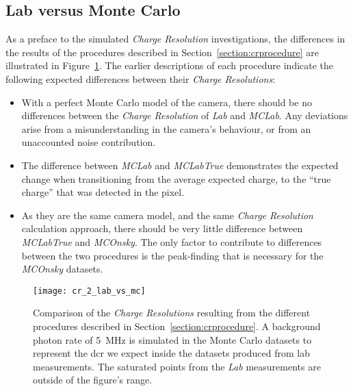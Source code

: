 \subsection{Lab versus Monte Carlo}

As a preface to the simulated \textit{Charge Resolution} investigations, the differences in the results of the procedures described in Section~\ref{section:crprocedure} are illustrated in Figure~\ref{fig:cr_2_lab_vs_mc}. The earlier descriptions of each procedure indicate the following expected differences between their \textit{Charge Resolutions}:
\begin{itemize}
\item With a perfect Monte Carlo model of the camera, there should be no differences between the \textit{Charge Resolution} of \textit{Lab} and \textit{MCLab}. Any deviations arise from a misunderstanding in the camera's behaviour, or from an unaccounted noise contribution.
\item The difference between \textit{MCLab} and \textit{MCLabTrue} demonstrates the expected change when transitioning from the average expected charge, to the ``true charge'' that was detected in the pixel.
\item As they are the same camera model, and the same \textit{Charge Resolution} calculation approach, there should be very little difference between \textit{MCLabTrue} and \textit{MCOnsky}. The only factor to contribute to differences between the two procedures is the peak-finding that is necessary for the \textit{MCOnsky} datasets.
\end{itemize}

\begin{figure}[H]
	\centering
    \texttt{[image: cr\_2\_lab\_vs\_mc]} 
	\caption[Comparison of the different \textit{Charge Resolution} procedures.]{Comparison of the \textit{Charge Resolutions} resulting from the different procedures described in Section~\ref{section:crprocedure}. A background photon rate of \SI{5}{MHz} is simulated in the Monte Carlo datasets to represent the \gls{dcr} we expect inside the datasets produced from lab measurements. The saturated points from the \textit{Lab} measurements are outside of the figure's range.}
	\label{fig:cr_2_lab_vs_mc}
\end{figure}

